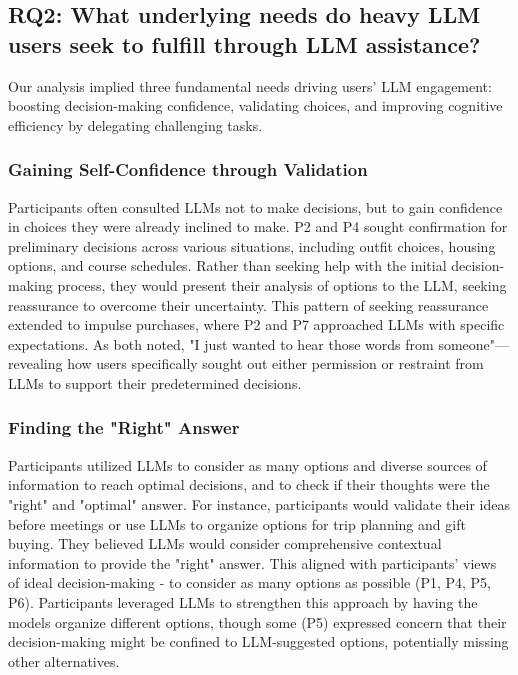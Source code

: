 \subsection{RQ2: What underlying needs do heavy LLM users seek to fulfill through LLM assistance?}
Our analysis implied three fundamental needs driving users' LLM engagement: boosting decision-making confidence, validating choices, and improving cognitive efficiency by delegating challenging tasks.

\subsubsection{Gaining Self-Confidence through Validation}
Participants often consulted LLMs not to make decisions, but to gain confidence in choices they were already inclined to make. P2 and P4 sought confirmation for preliminary decisions across various situations, including outfit choices, housing options, and course schedules. Rather than seeking help with the initial decision-making process, they would present their analysis of options to the LLM, seeking reassurance to overcome their uncertainty. This pattern of seeking reassurance extended to impulse purchases, where P2 and P7 approached LLMs with specific expectations. As both noted, "I just wanted to hear those words from someone"---revealing how users specifically sought out either permission or restraint from LLMs to support their predetermined decisions.

\subsubsection{Finding the "Right" Answer}
Participants utilized LLMs to consider as many options and diverse sources of information to reach optimal decisions, and to check if their thoughts were the "right" and "optimal" answer. For instance, participants would validate their ideas before meetings or use LLMs to organize options for trip planning and gift buying. They believed LLMs would consider comprehensive contextual information to provide the "right" answer. This aligned with participants' views of ideal decision-making - to consider as many options as possible (P1, P4, P5, P6). Participants leveraged LLMs to strengthen this approach by having the models organize different options, though some (P5) expressed concern that their decision-making might be confined to LLM-suggested options, potentially missing other alternatives.

